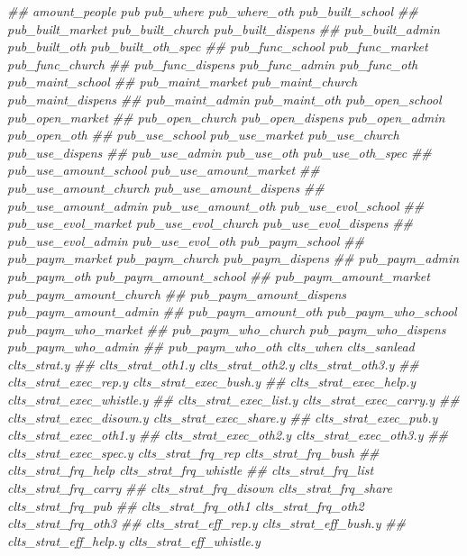 \documentclass[
]{article}
\newenvironment{Shaded}{\begin{snugshade}}{\end{snugshade}}
\newcommand{\CommentTok}[1]{\textcolor[rgb]{0.56,0.35,0.01}{\textit{#1}}}
\begin{document}
\begin{Shaded}
\begin{Highlighting}[]
\CommentTok{##      amount_people pub pub_where pub_where_oth pub_built_school}
\CommentTok{##      pub_built_market pub_built_church pub_built_dispens}
\CommentTok{##      pub_built_admin pub_built_oth pub_built_oth_spec}
\CommentTok{##      pub_func_school pub_func_market pub_func_church}
\CommentTok{##      pub_func_dispens pub_func_admin pub_func_oth pub_maint_school}
\CommentTok{##      pub_maint_market pub_maint_church pub_maint_dispens}
\CommentTok{##      pub_maint_admin pub_maint_oth pub_open_school pub_open_market}
\CommentTok{##      pub_open_church pub_open_dispens pub_open_admin pub_open_oth}
\CommentTok{##      pub_use_school pub_use_market pub_use_church pub_use_dispens}
\CommentTok{##      pub_use_admin pub_use_oth pub_use_oth_spec}
\CommentTok{##      pub_use_amount_school pub_use_amount_market}
\CommentTok{##      pub_use_amount_church pub_use_amount_dispens}
\CommentTok{##      pub_use_amount_admin pub_use_amount_oth pub_use_evol_school}
\CommentTok{##      pub_use_evol_market pub_use_evol_church pub_use_evol_dispens}
\CommentTok{##      pub_use_evol_admin pub_use_evol_oth pub_paym_school}
\CommentTok{##      pub_paym_market pub_paym_church pub_paym_dispens}
\CommentTok{##      pub_paym_admin pub_paym_oth pub_paym_amount_school}
\CommentTok{##      pub_paym_amount_market pub_paym_amount_church}
\CommentTok{##      pub_paym_amount_dispens pub_paym_amount_admin}
\CommentTok{##      pub_paym_amount_oth pub_paym_who_school pub_paym_who_market}
\CommentTok{##      pub_paym_who_church pub_paym_who_dispens pub_paym_who_admin}
\CommentTok{##      pub_paym_who_oth clts_when clts_sanlead clts_strat.y}
\CommentTok{##      clts_strat_oth1.y clts_strat_oth2.y clts_strat_oth3.y}
\CommentTok{##      clts_strat_exec_rep.y clts_strat_exec_bush.y}
\CommentTok{##      clts_strat_exec_help.y clts_strat_exec_whistle.y}
\CommentTok{##      clts_strat_exec_list.y clts_strat_exec_carry.y}
\CommentTok{##      clts_strat_exec_disown.y clts_strat_exec_share.y}
\CommentTok{##      clts_strat_exec_pub.y clts_strat_exec_oth1.y}
\CommentTok{##      clts_strat_exec_oth2.y clts_strat_exec_oth3.y}
\CommentTok{##      clts_strat_exec_spec.y clts_strat_frq_rep clts_strat_frq_bush}
\CommentTok{##      clts_strat_frq_help clts_strat_frq_whistle}
\CommentTok{##      clts_strat_frq_list clts_strat_frq_carry}
\CommentTok{##      clts_strat_frq_disown clts_strat_frq_share clts_strat_frq_pub}
\CommentTok{##      clts_strat_frq_oth1 clts_strat_frq_oth2 clts_strat_frq_oth3}
\CommentTok{##      clts_strat_eff_rep.y clts_strat_eff_bush.y}
\CommentTok{##      clts_strat_eff_help.y clts_strat_eff_whistle.y}

\end{Highlighting}
\end{Shaded}
\end{document}
